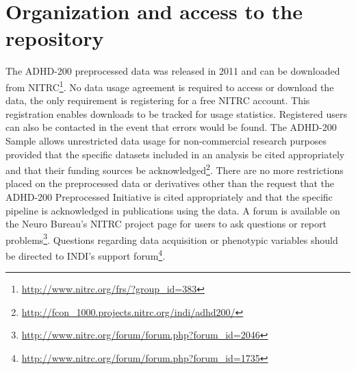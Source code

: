 \documentclass[preprint,12pt,5p]{elsarticle}
\begin{document}


\section{Organization and access to the repository}

The ADHD-200 preprocessed data was released in 2011 and can be downloaded from NITRC\footnote{\url{http://www.nitrc.org/frs/?group_id=383}}. No data usage agreement is required to access or download the data, the only requirement is registering for a free NITRC account. This registration enables downloads to be tracked for usage statistics. Registered users can also be contacted in the event that errors would be found. The ADHD-200 Sample allows unrestricted data usage for non-commercial research purposes provided that the specific datasets included in an analysis be cited appropriately and that their funding sources be acknowledged\footnote{\url{http://fcon_1000.projects.nitrc.org/indi/adhd200/}}. There are no more restrictions placed on the preprocessed data or derivatives other than the request that the ADHD-200 Preprocessed Initiative is cited appropriately and that the specific pipeline is acknowledged in publications using the data. A forum is available on the Neuro Bureau's NITRC project page for users to ask questions or report
problems\footnote{\url{http://www.nitrc.org/forum/forum.php?forum_id=2046}}. Questions regarding data acquisition or phenotypic variables should be directed to INDI's support forum\footnote{\url{http://www.nitrc.org/forum/forum.php?forum_id=1735}}. 
\end{document}
